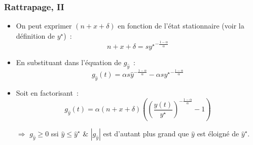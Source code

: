 \documentclass[10pt,notheorems]{beamer}
\theoremstyle{plain}
\theoremstyle{definition} %
\begin{document}
\begin{frame}
  \frametitle{Rattrapage, II}

  \begin{itemize}

  \item On peut exprimer $(n+x+\delta)$ en fonction de l'état stationnaire (voir la définition de $y^\star$)~:
    \[
      n+x+\delta = s \left.y^{\star}\right.^{-\frac{1-\alpha}{\alpha}}
    \]

  \item En substituant dans l'équation de $g_{\hat y}$~:
    \[
      g_{\hat y}(t) = \alpha s  \hat y^{-\frac{1-\alpha}{\alpha}} - \alpha s \left.y^{\star}\right.^{-\frac{1-\alpha}{\alpha}}
    \]

  \item Soit en factorisant~:
    \[
      g_{\hat y}(t) = \alpha (n+x+\delta)\left(\left(\frac{y(t)}{y^{\star}}\right)^{-\frac{1-\alpha}{\alpha}}-1\right)
    \]

  \item[$\Rightarrow$] $g_{\hat y}\geq 0$ ssi $\hat y\leq \left.\hat y^{\star}\right.$ \& $|g_{\hat y}|$ est d'autant plus grand que $\hat y$ est éloigné de $\hat y^\star$.

  \end{itemize}

\end{frame}
\end{document}
